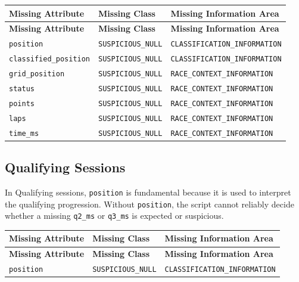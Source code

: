 \documentclass[a4paper,11pt]{article}
\begin{document}
	\begin{longtable}{p{5cm}p{4cm}p{6cm}}
		\toprule
		\textbf{Missing Attribute} & \textbf{Missing Class} & \textbf{Missing Information Area} \\
		\midrule
		\endfirsthead
		
		\toprule
		\textbf{Missing Attribute} & \textbf{Missing Class} & \textbf{Missing Information Area} \\
		\midrule
		\endhead
		
		\texttt{position}
		& \texttt{SUSPICIOUS\_NULL}
		& \texttt{CLASSIFICATION\_INFORMATION} \\
		\midrule
		
		\texttt{classified\_position}
		& \texttt{SUSPICIOUS\_NULL}
		& \texttt{CLASSIFICATION\_INFORMATION} \\
		\midrule
		
		\texttt{grid\_position}
		& \texttt{SUSPICIOUS\_NULL}
		& \texttt{RACE\_CONTEXT\_INFORMATION} \\
		\midrule
		
		\texttt{status}
		& \texttt{SUSPICIOUS\_NULL}
		& \texttt{RACE\_CONTEXT\_INFORMATION} \\
		\midrule
		
		\texttt{points}
		& \texttt{SUSPICIOUS\_NULL}
		& \texttt{RACE\_CONTEXT\_INFORMATION} \\
		\midrule
		
		\texttt{laps}
		& \texttt{SUSPICIOUS\_NULL}
		& \texttt{RACE\_CONTEXT\_INFORMATION} \\
		\midrule
		
		\texttt{time\_ms}
		& \texttt{SUSPICIOUS\_NULL}
		& \texttt{RACE\_CONTEXT\_INFORMATION} \\
		\bottomrule
	\end{longtable}

	
	\subsection{Qualifying Sessions}
	

	In Qualifying sessions, \texttt{position} is fundamental because it is used to interpret the qualifying progression.
	Without \texttt{position}, the script cannot reliably decide whether a missing \texttt{q2\_ms} or \texttt{q3\_ms} is expected or suspicious.
	
	\begin{longtable}{p{4cm}p{4cm}p{6cm}}
		\toprule
		\textbf{Missing Attribute} & \textbf{Missing Class} & \textbf{Missing Information Area} \\
		\midrule
		\endfirsthead
		
		\toprule
		\textbf{Missing Attribute} & \textbf{Missing Class} & \textbf{Missing Information Area} \\
		\midrule
		\endhead
		
		\texttt{position}
		& \texttt{SUSPICIOUS\_NULL}
		& \texttt{CLASSIFICATION\_INFORMATION} \\
		\bottomrule
	\end{longtable}
	
\end{document}
